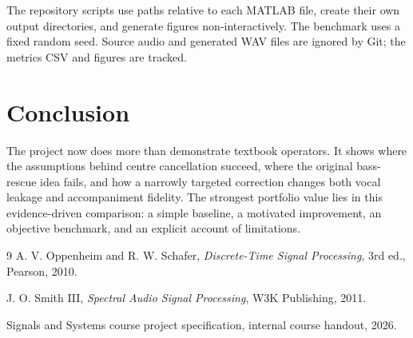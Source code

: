\documentclass[11pt,a4paper]{article}
\begin{document}
The repository scripts use paths relative to each MATLAB file, create their own
output directories, and generate figures non-interactively. The benchmark uses
a fixed random seed. Source audio and generated WAV files are ignored by Git;
the metrics CSV and figures are tracked.

\section{Conclusion}

The project now does more than demonstrate textbook operators. It shows where
the assumptions behind centre cancellation succeed, where the original
bass-rescue idea fails, and how a narrowly targeted correction changes both
vocal leakage and accompaniment fidelity. The strongest portfolio value lies in
this evidence-driven comparison: a simple baseline, a motivated improvement,
an objective benchmark, and an explicit account of limitations.

\begin{thebibliography}{9}
A. V. Oppenheim and R. W. Schafer,
\textit{Discrete-Time Signal Processing}, 3rd ed., Pearson, 2010.

J. O. Smith III,
\textit{Spectral Audio Signal Processing}, W3K Publishing, 2011.

Signals and Systems course project specification, internal course handout, 2026.
\end{thebibliography}
\end{document}
